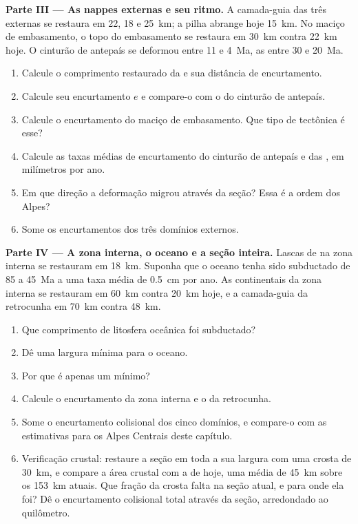 \begin{problem}
\noindent\textbf{Parte III --- As nappes externas e seu ritmo.} A camada-guia das
três  externas se restaura em 22, 18 e \qty{25}{km}; a pilha abrange hoje
\qty{15}{km}. No maciço de embasamento, o topo do embasamento se restaura em \qty{30}{km}
contra \qty{22}{km} hoje. O cinturão de antepaís se deformou entre 11 e \qty{4}{Ma}, as
 entre 30 e \qty{20}{Ma}.
\begin{enumerate}[resume]
\item Calcule o comprimento restaurado da  e sua distância de encurtamento.
\item Calcule seu encurtamento $e$ e compare-o com o do cinturão de antepaís.
\item Calcule o encurtamento do maciço de embasamento. Que tipo de tectônica é esse?
\item Calcule as taxas médias de encurtamento do cinturão de antepaís e das , em
milímetros por ano.
\item Em que direção a deformação migrou através da seção? Essa é a ordem
dos Alpes?
\item Some os encurtamentos dos três domínios externos.
\end{enumerate}

\noindent\textbf{Parte IV --- A zona interna, o oceano e a seção inteira.}
Lascas de  na zona interna se restauram em \qty{18}{km}. Suponha que o oceano tenha sido
subductado de 85 a \qty{45}{Ma} a uma taxa média de \qty{0.5}{cm} por ano. As 
continentais da zona interna se restauram em \qty{60}{km} contra \qty{20}{km} hoje, e a
camada-guia da retrocunha em \qty{70}{km} contra \qty{48}{km}.
\begin{enumerate}[resume]
\item Que comprimento de litosfera oceânica foi subductado?
\item Dê uma largura mínima para o oceano.
\item Por que é apenas um mínimo?
\item Calcule o encurtamento da zona interna e o da retrocunha.
\item Some o encurtamento colisional dos cinco domínios, e compare-o com as
estimativas para os Alpes Centrais deste capítulo.
\item Verificação crustal: restaure a seção em toda a sua largura com uma crosta de \qty{30}{km}, e
compare a área crustal com a de hoje, uma média de \qty{45}{km} sobre os
\qty{153}{km} atuais. Que fração da crosta falta na seção atual, e para onde
ela foi? Dê o encurtamento colisional total através da seção, arredondado ao
quilômetro.
\end{enumerate}
\end{problem}
